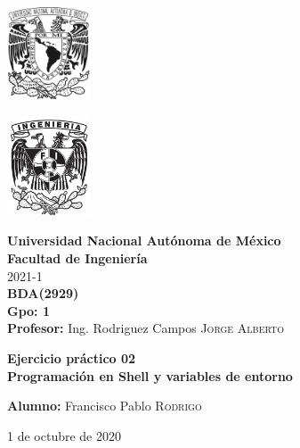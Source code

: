 \documentclass{article}
\newcommand{\materia}{BDA}
\newcommand{\clave}{2929}
\newcommand{\profesor}{Ing. Rodriguez Campos \textsc{Jorge Alberto}}
\newcommand{\semestre}{2021-1}
\newcommand{\alumno}{Francisco Pablo \textsc{Rodrigo}}
\newcommand{\actividad}{Ejercicio práctico 02}
\newcommand{\titulo}{Programación en Shell y variables de entorno}
\newcommand{\fechaEntrega}{1 de octubre de 2020}
\begin{document}
\thispagestyle{empty}
\begin{minipage}[t][5cm][t]{0.2\linewidth}
    \includegraphics[width=2.5cm]{unam.jpg}
    \vspace{10cm}

    \includegraphics[width=2.5cm]{fiblack}
\end{minipage}
\begin{minipage}[t]{0.7\linewidth}
    \vspace{-2.5cm}
    \LARGE{\textbf{Universidad Nacional Autónoma de México}}\\
    \Large{\textbf{Facultad de Ingeniería}} \\

    \large{\semestre}\\[2cm]

    \large{\textbf{\materia (\clave)}}\\
    \large{\textbf{Gpo: 1}}\\[5mm]
    \large{\textbf{Profesor:} \profesor}\\ [1.5cm]
    \begin{center}
        \LARGE{\textbf{\actividad}}\\
        \LARGE{\textbf{\titulo}}\\
    \end{center}

    \vspace{3.3cm}

    \large{\textbf{Alumno:} \alumno} \\[1.5cm]

    \begin{flushright}
        \fechaEntrega%
    \end{flushright}
\end{minipage}

\newpage
\end{document}
